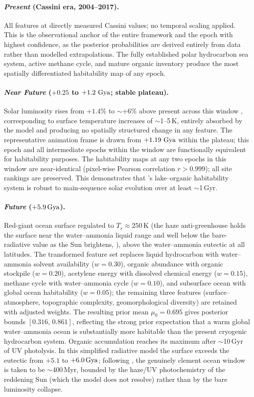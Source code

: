 \paragraph{\textit{Present} (Cassini era, 2004--2017).}
All features at directly measured Cassini values; no temporal scaling applied.  This is the observational anchor of the entire framework and the epoch with highest confidence, as the posterior probabilities are derived entirely from data rather than modelled extrapolations.  The fully established polar hydrocarbon sea system, active methane cycle, and mature organic inventory produce the most spatially differentiated habitability map of any epoch.

\paragraph{\textit{Near Future} ($+0.25$ to $+1.2\,\,\text{Gya}$; stable plateau).}
Solar luminosity rises from $+1.4\%$ to $\sim+6\%$ above present across this window \citep{Bahcall2001}, corresponding to surface temperature increases of $\sim$1--5\,K, entirely absorbed by the model and producing no spatially structured change in any feature.  The representative animation frame is drawn from $+1.19\,\,\text{Gya}$ within the plateau; this epoch and all intermediate epochs within the window are functionally equivalent for habitability purposes.  The habitability maps at any two epochs in this window are near-identical (pixel-wise Pearson correlation $r > 0.999$); all site rankings are preserved.  This demonstrates that \titan{}'s lake--organic habitability system is robust to main-sequence solar evolution over at least $\sim$1\,Gyr.

\paragraph{\textit{Future} ($+5.9\,\text{Gya}$).}
Red-giant ocean surface regulated to $T_s\approx250$\,K (the haze anti-greenhouse holds the surface near the water--ammonia liquid range and well below the bare-radiative value as the Sun brightens, \citealt{Lorenz1997}), above the water--ammonia eutectic at all latitudes.  The transformed feature set replaces liquid hydrocarbon with water--ammonia solvent availability ($w=0.30$), organic abundance with organic stockpile ($w=0.20$), acetylene energy with dissolved chemical energy ($w=0.15$), methane cycle with water--ammonia cycle ($w=0.10$), and subsurface ocean with global ocean habitability ($w=0.05$); the remaining three features (surface--atmosphere, topographic complexity, geomorphological diversity) are retained with adjusted weights.  The resulting prior mean $\mu_0 = 0.695$ gives posterior bounds $[0.316,\,0.861]$, reflecting the strong prior expectation that a warm global water--ammonia ocean is substantially more habitable than the present cryogenic hydrocarbon system.  Organic accumulation reaches its maximum after $\sim$10\,Gyr of UV photolysis.  In this simplified radiative model the surface exceeds the eutectic from $+5.1$ to $+6.0\,\text{Gya}$; following \citet{Lorenz1997}, the genuinely clement ocean window is taken to be $\sim$400\,Myr, bounded by the haze/UV photochemistry of the reddening Sun (which the model does not resolve) rather than by the bare luminosity collapse.

